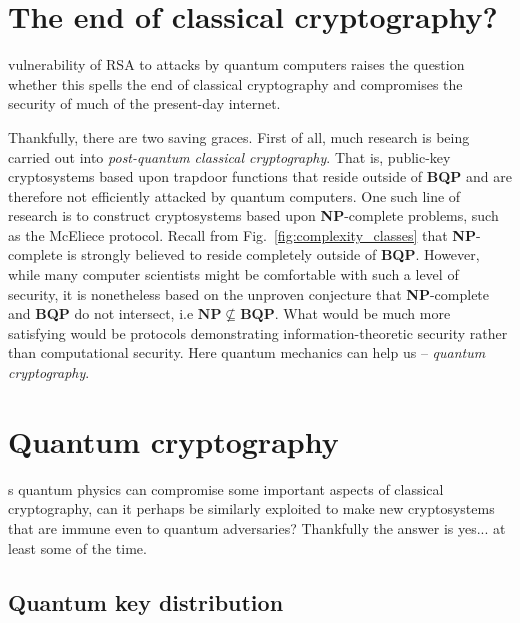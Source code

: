 %
%

\section{The end of classical cryptography?} \label{sec:end_of_class_crypto}

 vulnerability of RSA to attacks by quantum computers raises the question whether this spells the end of classical cryptography and compromises the security of much of the present-day internet.

Thankfully, there are two saving graces. First of all, much research is being carried out into \textit{post-quantum classical cryptography}. That is, public-key cryptosystems based upon trapdoor functions that reside outside of \textbf{BQP} and are therefore not efficiently attacked by quantum computers. One such line of research is to construct cryptosystems based upon \textbf{NP}-complete problems, such as the McEliece protocol. Recall from Fig.~\ref{fig:complexity_classes} that \textbf{NP}-complete is strongly believed to reside completely outside of \textbf{BQP}. However, while many computer scientists might be comfortable with such a level of security, it is nonetheless based on the unproven conjecture that \textbf{NP}-complete and \textbf{BQP} do not intersect, i.e \mbox{$\mathbf{NP}\nsubseteq\mathbf{BQP}$}. What would be much more satisfying would be protocols demonstrating information-theoretic security rather than computational security. Here quantum mechanics can help us -- \textit{quantum cryptography}.

%
%

\section{Quantum cryptography}

s quantum physics can compromise some important aspects of classical cryptography, can it perhaps be similarly exploited to make new cryptosystems that are immune even to quantum adversaries? Thankfully the answer is yes... at least some of the time.

%
%

\subsection{Quantum key distribution} \label{sec:QKD} 


